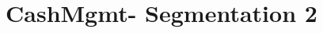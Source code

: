 \documentclass{article}
\begin{document}
\thispagestyle{empty}
\printtitle									%
  	\vfill
\printauthor
\newpage

\tableofcontents
\thispagestyle{empty}
\newpage

\def\BU{CashMgmt}
\def\SegmentTwo{2}
\newcommand\SegmentsTwoComponent{CASHMT, GlobalPaymentExFX, TSexGlobalPayments,
SupplyChain, Total_Other, Trade, InfoAndLiquidity, Other, Recon_Error}

\section{\BU - Segmentation 2}
	
	
\CleanUp
\end{document}
